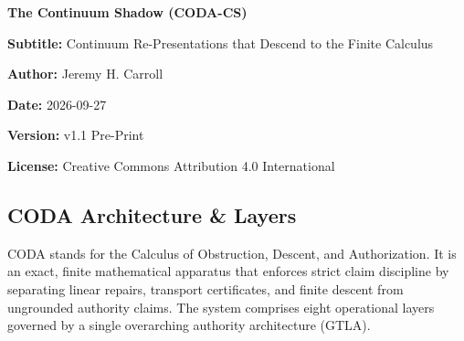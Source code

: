\documentclass[
  11pt,
]{article}
\begin{document}
\begin{center}
{\Large\bfseries The Continuum Shadow (CODA-CS)}\par
\textbf{Subtitle:} Continuum Re-Presentations that Descend to the Finite Calculus

\textbf{Author:} Jeremy H. Carroll

\textbf{Date:} 2026-09-27

\textbf{Version:} v1.1 Pre-Print

\textbf{License:} Creative Commons Attribution 4.0 International

\end{center}

\subsection{CODA Architecture \& Layers}\label{coda-architecture-layers}

CODA stands for the Calculus of Obstruction, Descent, and Authorization. It is an exact, finite mathematical apparatus that enforces strict claim discipline by separating linear repairs, transport certificates, and finite descent from ungrounded authority claims. The system comprises eight operational layers governed by a single overarching authority architecture (GTLA).
\end{document}
